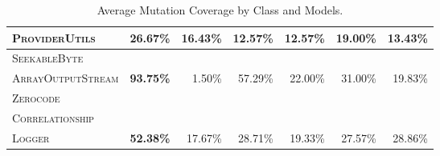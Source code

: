 \begin{table}[H]
\begin{tabular}{| l | r | r | r | r | r | r |}
\scriptsize\textsc{ProviderUtils} & \textbf{26.67\%} & 16.43\% & 12.57\% & 12.57\% & 19.00\% & 13.43\% \\
\hline
\scriptsize\textsc{SeekableByte} &  &  &  &  &  &  \\
\scriptsize\textsc{ArrayOutputStream} & \textbf{93.75\%} & 1.50\% & 57.29\% & 22.00\% & 31.00\% & 19.83\% \\
\hline
\scriptsize\textsc{Zerocode} &  &  &  &  &  &  \\
\scriptsize\textsc{Correlationship} &  &  &  &  &  &  \\
\scriptsize\textsc{Logger} & \textbf{52.38\%} & 17.67\% & 28.71\% & 19.33\% & 27.57\% & 28.86\% \\
\hline

\end{tabular}
\caption{Average Mutation Coverage by Class and Models.\protect\footnotemark}
\label{tab:mutation_coverage}
\end{table}


